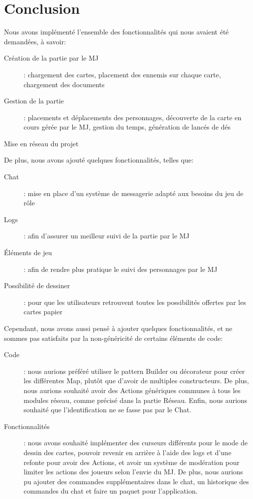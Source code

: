 \section{Conclusion}

Nous avons implémenté l'ensemble des fonctionnalités qui nous avaient été demandées, à savoir:
\begin{description}
	\item[Création de la partie par le MJ]: chargement des cartes, placement des ennemis sur chaque carte, chargement des documents
	\item[Gestion de la partie]: placements et déplacements des personnages, découverte de la carte en cours gérée par le MJ, gestion du temps, génération de lancés de dés
	\item[Mise en réseau du projet]
\end{description}
\hfill

De plus, nous avons ajouté quelques fonctionnalités, telles que:
\begin{description}
	\item[Chat]: mise en place d'un système de messagerie adapté aux besoins du jeu de rôle
	\item[Logs]: afin d'assurer un meilleur suivi de la partie par le MJ
	\item[Éléments de jeu]: afin de rendre plus pratique le suivi des personnages par le MJ
	\item[Possibilité de dessiner]: pour que les utilisateurs retrouvent toutes les possibilités offertes par les cartes papier
\end{description}
\hfill

Cependant, nous avons aussi pensé à ajouter quelques fonctionnalités, et ne sommes pas satisfaits par la non-généricité de certains éléments de code:
\begin{description}
	\item[Code]: nous aurions préféré utiliser le pattern Builder ou décorateur pour créer les différentes Map, plutôt que d'avoir de multiples constructeurs. De plus, nous aurions souhaité avoir des Actions génériques communes à tous les modules réseau, comme précisé dans la partie Réseau. Enfin, nous aurions souhaité que l'identification ne se fasse pas par le Chat.
	\item[Fonctionnalités]: nous avons souhaité implémenter des curseurs différents pour le mode de dessin des cartes, pouvoir revenir en arrière à l'aide des logs et d'une refonte pour avoir des Actions, et avoir un système de modération pour limiter les actions des joueurs selon l'envie du MJ. De plus, nous aurions pu ajouter des commandes supplémentaires dans le chat, un historique des commandes du chat et faire un paquet pour l'application.
\end{description}